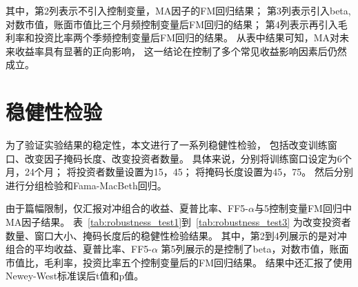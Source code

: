 其中，第2列表示不引入控制变量，MA因子的FM回归结果；
第3列表示引入beta,对数市值，账面市值比三个月频控制变量后FM回归的结果；
第4列表示再引入毛利率和投资比率两个季频控制变量后FM回归的结果。
从表中结果可知，MA对未来收益率具有显著的正向影响，
这一结论在控制了多个常见收益影响因素后仍然成立。

\section{稳健性检验}
为了验证实验结果的稳定性，本文进行了一系列稳健性检验，
包括改变训练窗口、改变因子掩码长度、改变投资者数量。
具体来说，分别将训练窗口设定为6个月，24个月；
将投资者数量设置为15，45；
将掩码长度设置为45，75。
然后分别进行分组检验和Fama-MacBeth回归。

由于篇幅限制，仅汇报对冲组合的收益、夏普比率、FF5-$\alpha$与5控制变量FM回归中MA因子结果。
表~\ref{tab:robustness_test1}到~\ref{tab:robustness_test3}
为改变投资者数量、窗口大小、掩码长度后的稳健性检验结果。
其中，第2到4列展示的是对冲组合的平均收益、夏普比率、FF5-$\alpha$
第5列展示的是控制了beta，对数市值，账面市值比，毛利率，投资比率五个控制变量后的FM回归结果。
结果中还汇报了使用Newey-West标准误后t值和p值。

{\small
\begin{table}[H]
  \centering
  \caption{稳健性检验结果-投资者数量}
  \label{tab:robustness_test1}
\end{table}
}

